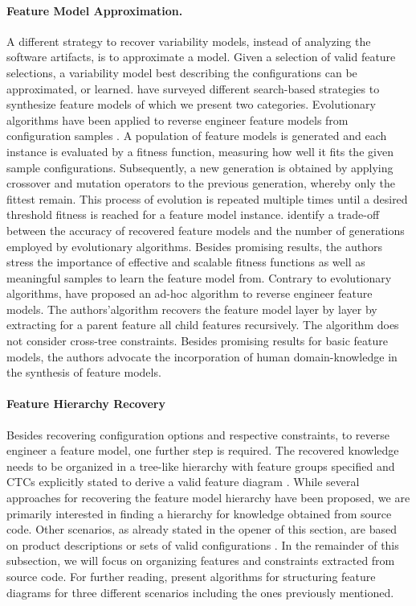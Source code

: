 \paragraph{Feature Model Approximation.}
A different strategy to recover variability models, instead of analyzing the
software artifacts, is to approximate a model. Given a selection of valid
feature selections, a variability model best describing the configurations can
be approximated, or learned. \cite{lopez-herrejon_assessment_2015} have surveyed
different search-based strategies to synthesize feature models of which we
present two categories. Evolutionary algorithms have been applied to reverse
engineer feature models from configuration samples
\citep{lopez-herrejon_reverse_2012,linsbauer_feature_2014}. A population of
feature models is generated and each instance is evaluated by a fitness function, measuring how well it fits the given sample configurations. Subsequently, a new generation is obtained by applying
crossover and mutation operators to the previous generation, whereby only the
fittest remain. This process of evolution is repeated multiple times until a
desired threshold fitness is reached for a feature model instance.
\cite{lopez-herrejon_reverse_2012} identify a trade-off between the accuracy of
recovered feature models and the number of generations employed by evolutionary
algorithms. Besides promising results, the authors stress the importance of
effective and scalable fitness functions as well as meaningful samples to learn
the feature model from.
Contrary to evolutionary algorithms,
\cite{haslinger_reverse_2011,haslinger_extracting_2013} have proposed an ad-hoc
algorithm to reverse engineer feature models. The authors’algorithm recovers
the feature model layer by layer by  extracting for a parent feature all child
features recursively. The algorithm does not consider cross-tree constraints.
Besides promising results for basic feature models, the authors advocate the
incorporation of human domain-knowledge in the synthesis of feature models.
 
\paragraph{Feature Hierarchy Recovery} \label{sec:feature_hierarchy}
Besides recovering configuration options and respective constraints, to reverse
engineer a feature model, one further step is required. The recovered knowledge
needs to be organized in a tree-like hierarchy with feature groups specified and
CTCs explicitly stated to derive a valid feature diagram 
\citep{kang_feature-oriented_1990}.
While several approaches for recovering the feature model hierarchy have been
proposed, we are primarily interested in finding a hierarchy for knowledge
obtained from source code. Other scenarios, as already stated in the opener of
this section, are based on product descriptions or sets of valid configurations
\citep{aleti_software_2013,bakar_feature_2015}. In the remainder of this
subsection, we will focus on organizing features and constraints extracted from
source code. For further reading, \cite{andersen_efficient_2012} present algorithms for structuring feature diagrams for three different scenarios including the ones previously mentioned.

